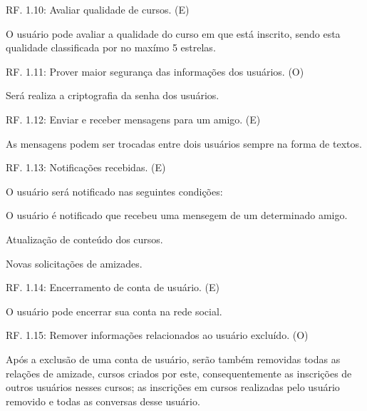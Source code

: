 \documentclass[12pt,a4paper,onecolumn,titlepage]{article}
\begin{document}
\begin{description}
\item RF. 1.10: Avaliar qualidade de cursos. (E)
\item \qquad O usuário pode avaliar a qualidade do curso em que está inscrito, sendo esta qualidade classificada por no maxímo 5 estrelas.

\item RF. 1.11: Prover maior segurança das informações dos usuários. (O)
\item \qquad Será realiza a criptografia da senha dos usuários.

\item RF. 1.12: Enviar e receber mensagens para um amigo. (E)
\item \qquad As mensagens podem ser trocadas entre dois usuários sempre na forma de textos.



\item RF. 1.13: Notificações recebidas. (E) 
\item \qquad O usuário será notificado nas seguintes condições:
\item \qquad O usuário é notificado que recebeu uma mensegem de um determinado amigo.
\item \qquad Atualização de conteúdo dos cursos.
\item \qquad Novas solicitações de amizades.

\item RF. 1.14: Encerramento de conta de usuário. (E)
\item \qquad O usuário pode encerrar sua conta na rede social.

\item RF. 1.15: Remover informações relacionados ao usuário excluído. (O)
\item \qquad Após a exclusão de uma conta de usuário, serão também removidas todas as relações de amizade, cursos criados por este, consequentemente as inscrições de outros usuários nesses cursos; as inscrições em cursos realizadas pelo usuário removido e todas as conversas desse usuário.


\end{description}
\end{document}
